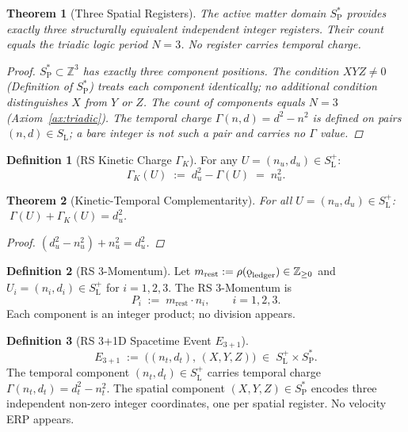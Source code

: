 \documentclass[11pt, letterpaper]{article}
\newcommand{\Z}{\mathbb{Z}}
\newcommand{\SL}{S_{\mathrm{L}}}
\newcommand{\SPs}{S_{\mathrm{P}}^{*}}
\newcommand{\SLpos}{S_{\mathrm{L}}^{+}}
\newcommand{\GK}{\Gamma_{K}}
\newcommand{\Ethree}{E_{3+1}}
\newcommand{\rank}{\rho}
\newcommand{\koppa}{\mathbin{\text{\rm\k{o}}}}
\newcommand{\Tcharge}{\Gamma}
\theoremstyle{definition}
\newtheorem{definition}{Definition}[section]
\theoremstyle{plain}
\newtheorem{theorem}{Theorem}[section]
\begin{document}
\begin{theorem}[Three Spatial Registers]\label{thm:registers}
The active matter domain $\SPs$ provides exactly three structurally equivalent
independent integer registers.  Their count equals the triadic logic period
$N=3$.  No register carries temporal charge.
\begin{proof}
$\SPs\subset\Z^3$ has exactly three component positions.  The condition
$XYZ\neq 0$ (Definition of $\SPs$) treats each component identically; no
additional condition distinguishes $X$ from $Y$ or $Z$.  The count of
components equals $N=3$ (Axiom~\ref{ax:triadic}).  The temporal charge
$\Tcharge(n,d)=d^2-n^2$ is defined on pairs $(n,d)\in\SL$; a bare integer
is not such a pair and carries no $\Tcharge$ value.
\end{proof}
\end{theorem}

\begin{definition}[RS Kinetic Charge $\GK$]\label{def:GK}
For any $U=(n_u,d_u)\in\SLpos$:
\[
\GK(U)\;:=\;d_u^2-\Tcharge(U)\;=\;n_u^2.
\]
\end{definition}

\begin{theorem}[Kinetic-Temporal Complementarity]\label{thm:complementarity}
For all $U=(n_u,d_u)\in\SLpos$: $\;\Tcharge(U)+\GK(U)=d_u^2$.
\begin{proof}
$(d_u^2-n_u^2)+n_u^2=d_u^2$.
\end{proof}
\end{theorem}

\begin{definition}[RS 3-Momentum]\label{def:momentum3}
Let $m_{\mathrm{rest}}:=\rank(\koppa_{\mathrm{ledger}})\in\Z_{\geq 0}$ and
$U_i=(n_i,d_i)\in\SLpos$ for $i=1,2,3$.  The RS 3-Momentum is
\[
P_i\;:=\;m_{\mathrm{rest}}\cdot n_i,\qquad i=1,2,3.
\]
Each component is an integer product; no division appears.
\end{definition}

\begin{definition}[RS 3+1D Spacetime Event $\Ethree$]\label{def:event3p1}
\[
\Ethree\;:=\;\bigl((n_t,d_t),\,(X,Y,Z)\bigr)\;\in\;\SLpos\times\SPs.
\]
The temporal component $(n_t,d_t)\in\SLpos$ carries temporal charge
$\Tcharge(n_t,d_t)=d_t^2-n_t^2$.  The spatial component
$(X,Y,Z)\in\SPs$ encodes three independent non-zero integer coordinates,
one per spatial register.  No velocity ERP appears.
\end{definition}
\end{document}
